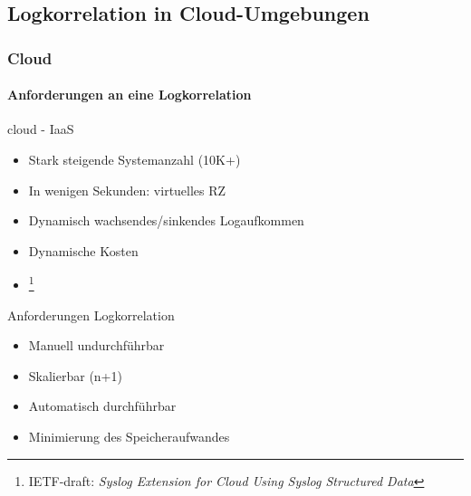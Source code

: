 
\subsection{Logkorrelation in Cloud-Umgebungen}
\begin{frame}
\frametitle{Cloud}
\framesubtitle{Anforderungen an eine Logkorrelation}

    \begin{block}{cloud - IaaS}
        \begin{itemize}
            \item Stark steigende Systemanzahl (10K+)
            \item In wenigen Sekunden: virtuelles RZ
            \item Dynamisch wachsendes/sinkendes Logaufkommen
            \item Dynamische Kosten
            \item \color{red}{Proprietäre, inkompatible Monitoringsysteme}
            \footnote{IETF-draft: \textit{Syslog Extension for Cloud Using Syslog 
            Structured Data}}
        \end{itemize}
    \end{block}
    \pause
    \begin{block}{Anforderungen Logkorrelation}
        \begin{itemize}
            \item Manuell undurchführbar
            \item Skalierbar (n+1)
            \item Automatisch durchführbar
            \item Minimierung des Speicheraufwandes
        \end{itemize}
    \end{block}

\end{frame}


